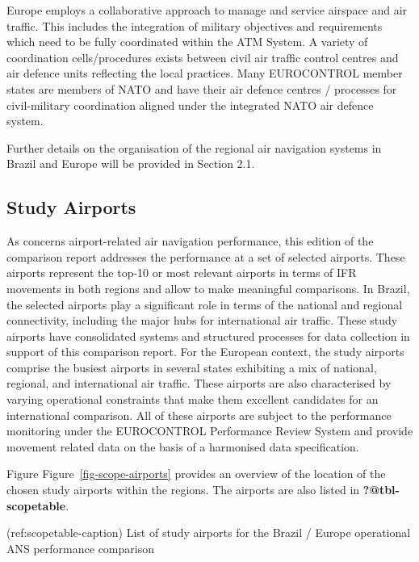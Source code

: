 \documentclass[
  a4paper,
  DIV=11,
  numbers=noendperiod]{scrreprt}
\begin{document}
Europe employs a collaborative approach to manage and service airspace
and air traffic. This includes the integration of military objectives
and requirements which need to be fully coordinated within the ATM
System. A variety of coordination cells/procedures exists between civil
air traffic control centres and air defence units reflecting the local
practices. Many EUROCONTROL member states are members of NATO and have
their air defence centres / processes for civil-military coordination
aligned under the integrated NATO air defence system.

Further details on the organisation of the regional air navigation
systems in Brazil and Europe will be provided in Section 2.1.

\hypertarget{study-airports}{%
\subsection{Study Airports}\label{study-airports}}

As concerns airport-related air navigation performance, this edition of
the comparison report addresses the performance at a set of selected
airports. These airports represent the top-10 or most relevant airports
in terms of IFR movements in both regions and allow to make meaningful
comparisons. In Brazil, the selected airports play a significant role in
terms of the national and regional connectivity, including the major
hubs for international air traffic. These study airports have
consolidated systems and structured processes for data collection in
support of this comparison report. For the European context, the study
airports comprise the busiest airports in several states exhibiting a
mix of national, regional, and international air traffic. These airports
are also characterised by varying operational constraints that make them
excellent candidates for an international comparison. All of these
airports are subject to the performance monitoring under the EUROCONTROL
Performance Review System and provide movement related data on the basis
of a harmonised data specification.

Figure Figure~\ref{fig-scope-airports} provides an overview of the
location of the chosen study airports within the regions. The airports
are also listed in \textbf{?@tbl-scopetable}.

(ref:scopetable-caption) List of study airports for the Brazil / Europe
operational ANS performance comparison

\providecommand{\docline}[3]{\noalign{\global\setlength{\arrayrulewidth}{#1}}\arrayrulecolor[HTML]{#2}\cline{#3}}
\end{document}
